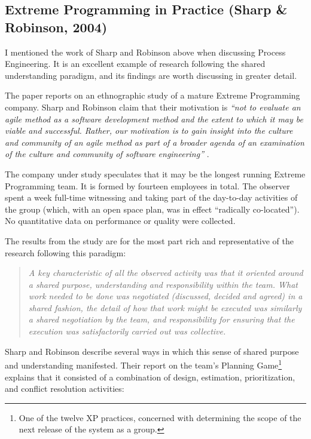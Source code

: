 \subsection{Extreme Programming in Practice (Sharp \& Robinson, 2004)}
\label{sec:Sharp}

I mentioned the work of Sharp and Robinson above when discussing Process Engineering. It is an excellent example of research following the shared understanding paradigm, and its findings are worth discussing in greater detail.

The paper reports on an ethnographic study of a mature Extreme Programming company. Sharp and Robinson claim that their motivation is \emph{``not to evaluate an agile method as a software development method and the extent to which it may be viable and successful. Rather, our motivation is to gain insight into the culture and community of an agile method as part of a broader agenda of an examination of the culture and community of software engineering''}  \cite{Sharp2004}.

The company under study speculates that it may be the longest running Extreme Programming team. It is formed by fourteen employees in total. The observer spent a week full-time witnessing and taking part of the day-to-day activities of the group (which, with an open space plan, was in effect ``radically co-located''). No quantitative data on performance or quality were collected.

The results from the study are for the most part rich and representative of the research following this paradigm:

\begin{quote}
\emph{A key characteristic of all the observed activity was that it oriented around a shared purpose, understanding and responsibility within the team. What work needed to be done was negotiated (discussed, decided and agreed) in a shared fashion, the detail of how that work might be executed was similarly a shared negotiation by the team, and responsibility for ensuring that the execution was satisfactorily carried out was collective.}
\end{quote}

Sharp and Robinson describe several ways in which this sense of shared purpose and understanding manifested. Their report on the team's Planning Game\footnote{One of the twelve XP practices, concerned with determining the scope of the next release of the system as a group.} explains that it consisted of a combination of design, estimation, prioritization, and conflict resolution activities:

